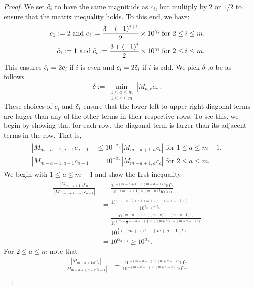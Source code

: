 \documentclass[12pt]{article}
\begin{document}
\begin{proof}
We set $\Tilde{c}_i$ to have the same magnitude as $c_i$, but multiply by 2 or $1/2$ to ensure that the matrix inequality holds. To this end, we have:
\begin{align*}
    c_1:=2 \text{ and } c_i:= \frac{3+(-1)^{i+1}}{2} \times 10^{\gamma_i} \text{ for } 2 \leq i \leq m ,\\
    \Tilde{c}_1:=1 \text{ and } \Tilde{c}_i:= \frac{3+(-1)^{i}}{2} \times 10^{\gamma_i} \text{ for } 2 \leq i \leq m .
\end{align*}
 This ensures $\Tilde{c}_i=2c_i$ if $i$ is even and $c_i=2\Tilde{c}_i$ if $i$ is odd. 
 We pick $\delta$ to be as follows
\[\delta:= \min_{\substack{1 \leq a \leq m \\ 1\leq r \leq m}} |M_{a,r} c_r| .\]
These choices of $c_i$ and $\Tilde{c}_i$ ensure that the lower left to upper right diagonal terms are larger than any of the other terms in their respective rows. To see this, we begin by showing that for each row, the diagonal term is larger than its adjacent terms in the row. That is,
\begin{align}\label{desired inequalities to satisfy}
\begin{split}
    |M_{m-a+1,a+1} c_{a+1}| &\leq 10^{-\alpha_a} |M_{m-a+1,a} c_{a}| \text{ for } 1 \leq a \leq m-1 ,\\
    |M_{m-a+1,a-1} c_{a-1}|&=10^{-\alpha_a} |M_{m-a+1,a} c_{a}| \text{ for } 2 \leq a \leq m .
\end{split}
\end{align}
We begin with $1 \leq a \leq m-1$ and show the first inequality
\begin{align*}
    \frac{|M_{m-a+1,a} c_{a}| }{| M_{m-a+1,a+1} c_{a+1}|}
    &=\frac{10^{-(m-a+1) \times (m+a-1)!} 10^{\gamma_a}}{ 10^{-(m-a+1) \times (m+a)!}10^{\gamma_{a+1}} }\\
    &= \frac{10^{(m-a+1)\times((m+a)!-(m+a-1)!)}}{10^{\gamma_{a+1}-\gamma_a}} \\
    &=\frac{10^{(m-a+1)\times((m+a)!-(m+a-1)!)} }{ 10^{(m-\frac{1}{2}-(a-1))\times((m+a)!-(m+a-1)!)}} \\
    &=10^{\frac{1}{2}((m+a)!-(m+a-1)!)} \\
    &=10^{\alpha_{a+1}} \geq 10^{\alpha_{a}} .
\end{align*}
For $2\leq a \leq m$ note that
\begin{align*}
    \frac{|M_{m-a+1,a} c_{a}| }{| M_{m-a+1,a-1} c_{a-1}|} &= \frac{10^{-(m-a+1) \times (m+a-1)!} 10^{\gamma_a} }{ 10^{-(m-a+1) \times (m+a-2)!}   10^{\gamma_{a-1}} } \\

\end{align*}
\end{proof}
\end{document}
